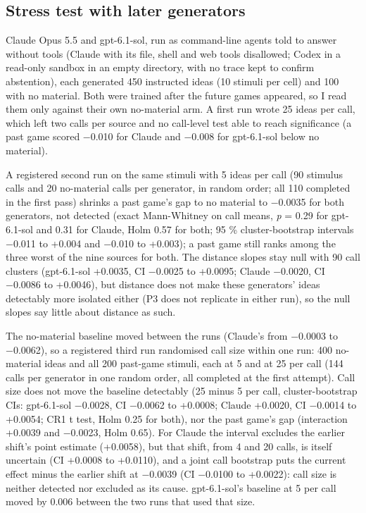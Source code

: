 \documentclass[
  10pt,
]{article}
\begin{document}
\subsection{Stress test with later generators}\label{app:C.3}

Claude Opus 5.5 and gpt-6.1-sol, run as
command-line agents told to answer
without tools (Claude with its file,
shell and web tools disallowed; Codex in
a read-only sandbox in an empty
directory, with no trace kept to confirm
abstention), each generated 450
instructed ideas (10 stimuli per cell)
and 100 with no material. Both were
trained after the future games appeared,
so I read them only against their own
no-material arm. A first run wrote 25
ideas per call, which left two calls per
source and no call-level test able to
reach significance (a past game scored
−0.010 for Claude and −0.008 for
gpt-6.1-sol below no material).

A registered second run on the same
stimuli with 5 ideas per call (90
stimulus calls and 20 no-material calls
per generator, in random order; all 110
completed in the first pass) shrinks a
past game's gap to no material to
−0.0035 for both generators, not
detected (exact Mann-Whitney on call
means, \emph{p} = 0.29 for gpt-6.1-sol
and 0.31 for Claude, Holm 0.57 for both;
95 \% cluster-bootstrap intervals −0.011
to +0.004 and −0.010 to +0.003); a past
game still ranks among the three worst
of the nine sources for both. The
distance slopes stay null with 90 call
clusters (gpt-6.1-sol +0.0035, CI
−0.0025 to +0.0095; Claude −0.0020, CI
−0.0086 to +0.0046), but distance does
not make these generators' ideas
detectably more isolated either (P3 does
not replicate in either run), so the
null slopes say little about distance as
such.

The no-material baseline moved between
the runs (Claude's from −0.0003 to
−0.0062), so a registered third run
randomised call size within one run: 400
no-material ideas and all 200 past-game
stimuli, each at 5 and at 25 per call
(144 calls per generator in one random
order, all completed at the first
attempt). Call size does not move the
baseline detectably (25 minus 5 per
call, cluster-bootstrap CIs: gpt-6.1-sol
−0.0028, CI −0.0062 to +0.0008; Claude
+0.0020, CI −0.0014 to +0.0054; CR1 t
test, Holm 0.25 for both), nor the past
game's gap (interaction +0.0039 and
−0.0023, Holm 0.65). For Claude the
interval excludes the earlier shift's
point estimate (+0.0058), but that
shift, from 4 and 20 calls, is itself
uncertain (CI +0.0008 to +0.0110), and a
joint call bootstrap puts the current
effect minus the earlier shift at
−0.0039 (CI −0.0100 to +0.0022): call
size is neither detected nor excluded as
its cause. gpt-6.1-sol's baseline at 5
per call moved by 0.006 between the two
runs that used that size.
\end{document}
